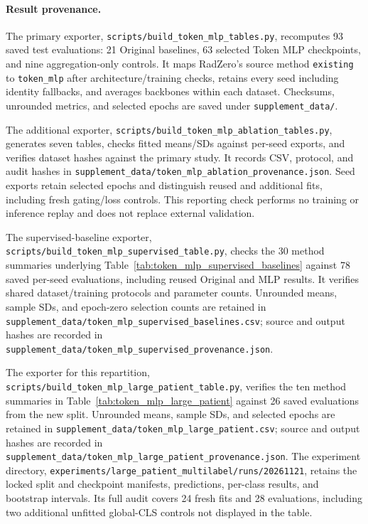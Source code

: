 \documentclass[10pt,twocolumn,letterpaper]{article}
\begin{document}
\paragraph{Result provenance.}
The primary exporter, \nolinkurl{scripts/build_token_mlp_tables.py}, recomputes 93 saved test evaluations: 21 Original baselines, 63 selected Token MLP checkpoints, and nine aggregation-only controls. It maps RadZero's source method \texttt{existing} to \texttt{token\_mlp} after architecture/training checks, retains every seed including identity fallbacks, and averages backbones within each dataset. Checksums, unrounded metrics, and selected epochs are saved under \nolinkurl{supplement_data/}.

The additional exporter, \nolinkurl{scripts/build_token_mlp_ablation_tables.py}, generates seven tables, checks fitted means/SDs against per-seed exports, and verifies dataset hashes against the primary study. It records CSV, protocol, and audit hashes in \nolinkurl{supplement_data/token_mlp_ablation_provenance.json}. Seed exports retain selected epochs and distinguish reused and additional fits, including fresh gating/loss controls. This reporting check performs no training or inference replay and does not replace external validation.

The supervised-baseline exporter, \nolinkurl{scripts/build_token_mlp_supervised_table.py}, checks the 30 method summaries underlying Table~\ref{tab:token_mlp_supervised_baselines} against 78 saved per-seed evaluations, including reused Original and MLP results. It verifies shared dataset/training protocols and parameter counts. Unrounded means, sample SDs, and epoch-zero selection counts are retained in \nolinkurl{supplement_data/token_mlp_supervised_baselines.csv}; source and output hashes are recorded in \nolinkurl{supplement_data/token_mlp_supervised_provenance.json}.

The exporter for this repartition, \nolinkurl{scripts/build_token_mlp_large_patient_table.py}, verifies the ten method summaries in Table~\ref{tab:token_mlp_large_patient} against 26 saved evaluations from the new split. Unrounded means, sample SDs, and selected epochs are retained in \nolinkurl{supplement_data/token_mlp_large_patient.csv}; source and output hashes are recorded in \nolinkurl{supplement_data/token_mlp_large_patient_provenance.json}. The experiment directory, \nolinkurl{experiments/large_patient_multilabel/runs/20261121}, retains the locked split and checkpoint manifests, predictions, per-class results, and bootstrap intervals. Its full audit covers 24 fresh fits and 28 evaluations, including two additional unfitted global-CLS controls not displayed in the table.
\end{document}
